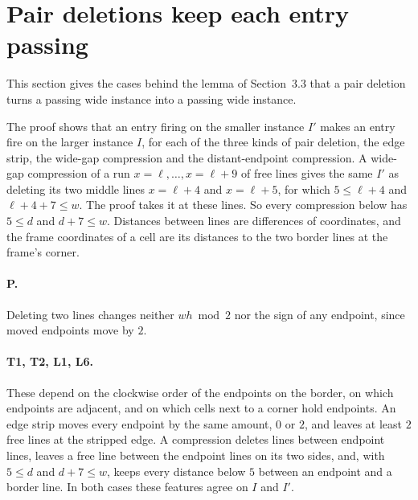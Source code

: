 \documentclass[11pt]{article}
\begin{document}
\section{Pair deletions keep each entry passing}\label{sec:keep}

This section gives the cases behind the lemma of Section~3.3 that a pair deletion turns a passing
wide instance into a passing wide instance.

The proof shows that an entry firing on the smaller instance $I'$ makes an entry fire on the
larger instance $I$, for each of the three kinds of pair deletion, the edge strip, the wide-gap
compression and the distant-endpoint compression. A wide-gap compression of a run
$x=\ell,\ldots,x=\ell+9$ of free lines gives the same $I'$ as deleting its two middle lines
$x=\ell+4$ and $x=\ell+5$, for which $5\le\ell+4$ and $\ell+4+7\le w$. The proof takes it at these
lines. So every compression below has $5\le d$ and $d+7\le w$. Distances between lines are
differences of coordinates, and the frame coordinates of a cell are its distances to the two
border lines at the frame's corner.

\paragraph{P.} Deleting two lines changes neither $wh\bmod 2$ nor the sign of any endpoint, since
moved endpoints move by $2$.

\paragraph{T1, T2, L1, L6.} These depend on the clockwise order of the endpoints on the border, on
which endpoints are adjacent, and on which cells next to a corner hold endpoints. An edge strip
moves every endpoint by the same amount, $0$ or $2$, and leaves at least $2$ free lines at the
stripped edge. A compression deletes lines between endpoint lines, leaves a free line between the
endpoint lines on its two sides, and, with $5\le d$ and $d+7\le w$, keeps every distance below $5$
between an endpoint and a border line. In both cases these features agree on $I$ and $I'$.
\end{document}
